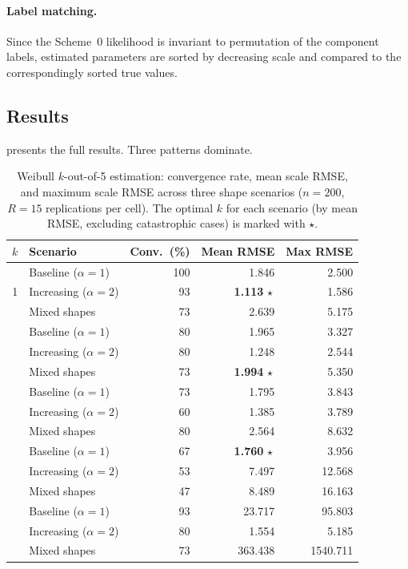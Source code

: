 \documentclass[12pt]{article}
\theoremstyle{definition}
\theoremstyle{remark}
\begin{document}
\paragraph{Label matching.}
Since the Scheme~0 likelihood is invariant to permutation of the
component labels, estimated parameters are sorted by decreasing
scale and compared to the correspondingly sorted true values.

\subsection{Results}
\label{sec:sim-results}

 presents the full results.
Three patterns dominate.

\begin{table}[t]
\centering
\caption{%
  Weibull $k$-out-of-5 estimation: convergence rate, mean scale RMSE,
  and maximum scale RMSE across three shape scenarios
  ($n = 200$, $R = 15$ replications per cell).  The optimal $k$ for
  each scenario (by mean RMSE, excluding catastrophic cases) is marked
  with $\star$.
}
\label{tab:weibull-results}
\small
\begin{tabular}{cl rrr}
\toprule
$k$ & Scenario & Conv.\ (\%) & Mean RMSE & Max RMSE \\
\midrule
\multirow{3}{*}{1}
  & Baseline ($\alpha = 1$)
    & 100 & 1.846 & 2.500 \\
  & Increasing ($\alpha = 2$)
    & 93 & \textbf{1.113}$\,\star$ & 1.586 \\
  & Mixed shapes
    & 73 & 2.639 & 5.175 \\
\addlinespace
\multirow{3}{*}{2}
  & Baseline ($\alpha = 1$)
    & 80 & 1.965 & 3.327 \\
  & Increasing ($\alpha = 2$)
    & 80 & 1.248 & 2.544 \\
  & Mixed shapes
    & 73 & \textbf{1.994}$\,\star$ & 5.350 \\
\addlinespace
\multirow{3}{*}{3}
  & Baseline ($\alpha = 1$)
    & 73 & 1.795 & 3.843 \\
  & Increasing ($\alpha = 2$)
    & 60 & 1.385 & 3.789 \\
  & Mixed shapes
    & 80 & 2.564 & 8.632 \\
\addlinespace
\multirow{3}{*}{4}
  & Baseline ($\alpha = 1$)
    & 67 & \textbf{1.760}$\,\star$ & 3.956 \\
  & Increasing ($\alpha = 2$)
    & 53 & 7.497 & 12.568 \\
  & Mixed shapes
    & 47 & 8.489 & 16.163 \\
\addlinespace
\multirow{3}{*}{5}
  & Baseline ($\alpha = 1$)
    & 93 & 23.717 & 95.803 \\
  & Increasing ($\alpha = 2$)
    & 80 & 1.554 & 5.185 \\
  & Mixed shapes
    & 73 & 363.438 & 1540.711 \\
\bottomrule
\end{tabular}
\end{table}
\end{document}
